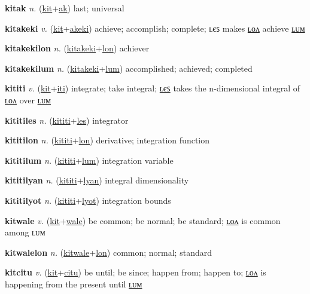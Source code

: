 \textbf{\hypertarget{kitak}{kitak}} \textit{n.} (\hyperlink{kit}{kit}+\allowbreak \hyperlink{ak}{ak})
last; universal

\textbf{\hypertarget{kitakeki}{kitakeki}} \textit{v.} (\hyperlink{kit}{kit}+\allowbreak \hyperlink{akeki}{akeki})
achieve; accomplish; complete; ʟєꜱ makes \hyperlink{kitakekilon}{ʟᴏᴧ} achieve \hyperlink{kitakekilum}{ʟᴜᴍ}

\textbf{\hypertarget{kitakekilon}{kitakekilon}} \textit{n.} (\hyperlink{kitakeki}{kitakeki}+\allowbreak \hyperlink{lon}{lon})
achiever

\textbf{\hypertarget{kitakekilum}{kitakekilum}} \textit{n.} (\hyperlink{kitakeki}{kitakeki}+\allowbreak \hyperlink{lum}{lum})
accomplished; achieved; completed

\textbf{\hypertarget{kititi}{kititi}} \textit{v.} (\hyperlink{kit}{kit}+\allowbreak \hyperlink{iti}{iti})
integrate; take integral; \hyperlink{kititiles}{ʟєꜱ} takes the n-dimensional integral of \hyperlink{kititilon}{ʟᴏᴧ} over \hyperlink{kititilum}{ʟᴜᴍ}

\textbf{\hypertarget{kititiles}{kititiles}} \textit{n.} (\hyperlink{kititi}{kititi}+\allowbreak \hyperlink{les}{les})
integrator

\textbf{\hypertarget{kititilon}{kititilon}} \textit{n.} (\hyperlink{kititi}{kititi}+\allowbreak \hyperlink{lon}{lon})
derivative; integration function

\textbf{\hypertarget{kititilum}{kititilum}} \textit{n.} (\hyperlink{kititi}{kititi}+\allowbreak \hyperlink{lum}{lum})
integration variable

\textbf{\hypertarget{kititilyan}{kititilyan}} \textit{n.} (\hyperlink{kititi}{kititi}+\allowbreak \hyperlink{lyan}{lyan})
integral dimensionality

\textbf{\hypertarget{kititilyot}{kititilyot}} \textit{n.} (\hyperlink{kititi}{kititi}+\allowbreak \hyperlink{lyot}{lyot})
integration bounds

\textbf{\hypertarget{kitwale}{kitwale}} \textit{v.} (\hyperlink{kit}{kit}+\allowbreak \hyperlink{wale}{wale})
be common; be normal; be standard; \hyperlink{kitwalelon}{ʟᴏᴧ} is common among ʟᴜᴍ

\textbf{\hypertarget{kitwalelon}{kitwalelon}} \textit{n.} (\hyperlink{kitwale}{kitwale}+\allowbreak \hyperlink{lon}{lon})
common; normal; standard

\textbf{\hypertarget{kitcitu}{kitcitu}} \textit{v.} (\hyperlink{kit}{kit}+\allowbreak \hyperlink{citu}{citu})
be until; be since; happen from; happen to; \hyperlink{kitcitulon}{ʟᴏᴧ} is happening from the present until \hyperlink{kitcitulum}{ʟᴜᴍ}

